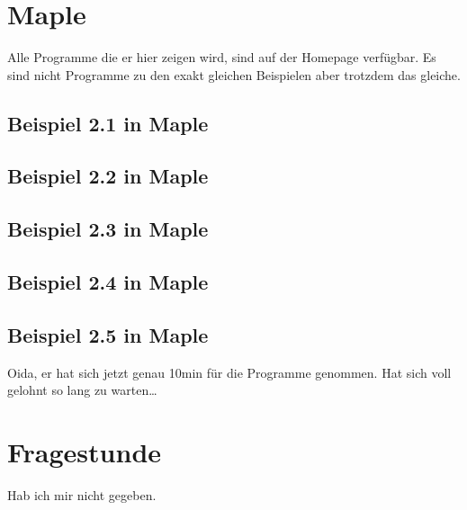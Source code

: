 \documentclass[a4paper]{article}
\begin{document}
\section*{Maple}
Alle Programme die er hier zeigen wird, sind auf der Homepage verfügbar.
Es sind nicht Programme zu den exakt gleichen Beispielen aber trotzdem das gleiche.
\subsection*{Beispiel 2.1 in Maple}
\subsection*{Beispiel 2.2 in Maple}
\subsection*{Beispiel 2.3 in Maple}
\subsection*{Beispiel 2.4 in Maple}
\subsection*{Beispiel 2.5 in Maple}

Oida, er hat sich jetzt genau 10min für die Programme genommen. Hat sich voll gelohnt so lang zu warten\ldots 
\section*{Fragestunde}
Hab ich mir nicht gegeben.
\end{document}

